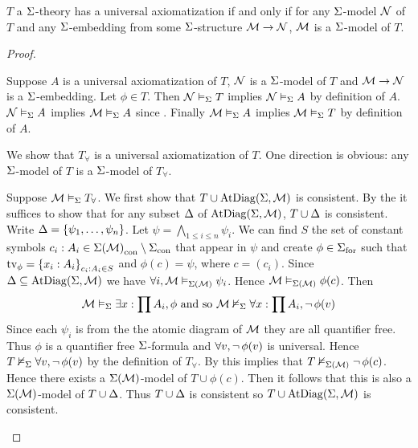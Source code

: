 \begin{prop}
    $T$ a $\Sigma$-theory has a universal axiomatization if and only if
    for any $\Sigma$-model $\mathcal{N}$ of $T$ and any $\Sigma$-embedding 
    from some $\Sigma$-structure $\mathcal{M} \to \mathcal{N}$,
    $\mathcal{M}$ is a $\Sigma$-model of $T$.
\end{prop}
\begin{proof}
    \begin{forward}
        Suppose $A$ is a universal axiomatization of $T$,
        $\mathcal{N}$ is a $\Sigma$-model of $T$ and $\mathcal{M} \to \mathcal{N}$ is a 
        $\Sigma$-embedding.
        Let $\phi \in T$. Then
        $\mathcal{N} \vDash_{\Sigma} T$ implies $\mathcal{N} \vDash_{\Sigma} A$
        by definition of $A$.
        $\mathcal{N} \vDash_{\Sigma} A$ implies $\mathcal{M} \vDash_{\Sigma} A$
        since .
        Finally $\mathcal{M} \vDash_{\Sigma} A$ implies $\mathcal{M} \vDash_{\Sigma} T$
        by definition of $A$.
    \end{forward}

    \begin{backward}
        We show that $T_\forall$ is a universal axiomatization of $T$.
        One direction is obvious:
        any $\Sigma$-model of $T$ is
        a $\Sigma$-model of $T_\forall$.

        Suppose $\mathcal{M} \vDash_{\Sigma} T_\forall$.
        We first show that $T \cup \mathrm{AtDiag}(\Sigma,\mathcal{M})$ is consistent.
        By the  
        it suffices to show that for any subset 
        $\Delta$ of $\mathrm{AtDiag}(\Sigma,\mathcal{M})$,
        $T \cup \Delta$ is consistent.
        Write $\Delta  = \left\{\psi_1, \dots, \psi_n\right\}$.
        Let $\psi = \bigwedge_{1 \leq i \leq n} \psi_i$.
        We can find $S$ the set of constant symbols $c_i : A_i
        \in {\Sigma(\mathcal{M})}_\mathrm{con} \setminus {\Sigma}_\mathrm{con}$ that appear in $\psi$
        and create $\phi \in {\Sigma}_\mathrm{for}$ 
        such that $\textrm{tv}_{\phi} = \left\{x_i : A_i\right\}_{c_i : A_i \in S}$ and
        $\phi(c) = \psi$, 
        where $c = (c_i)$.
        Since $\Delta \subseteq \mathrm{AtDiag}(\Sigma,\mathcal{M})$ we have
        $\forall i, \mathcal{M} \vDash_{\Sigma(\mathcal{M})} \psi_i$.
        Hence $\mathcal{M} \vDash_{\Sigma(\mathcal{M})} \phi(c)$.
        Then 
        \[\mathcal{M} \vDash_{\Sigma} \exists x : \prod A_i, \phi \text{ and so }
        \mathcal{M} \nvDash_{\Sigma} \forall x : \prod A_i, \neg\, \phi(v)\]
        Since each $\psi_i$ is from the the atomic diagram of $\mathcal{M}$ 
        they are all quantifier free.
        Thus $\phi$ is a quantifier free $\Sigma$-formula and 
        $\forall v,  \neg\, \phi(v)$ is universal.
        Hence $T \nvDash_{\Sigma} \forall v, \neg\, \phi(v)$ 
        by the definition of $T_\forall$.
        By 
        this implies that $T \nvDash_{\Sigma(\mathcal{M})} \neg\, \phi(c)$.
        Hence there exists a $\Sigma(\mathcal{M})$-model of $T \cup \phi(c)$.
        Then it follows that this is also a $\Sigma(\mathcal{M})$-model of $T \cup \Delta$.
        Thus $T \cup \Delta$ is consistent so
        $T \cup \mathrm{AtDiag}(\Sigma,\mathcal{M})$ is consistent.


\end{backward}
\end{proof}
